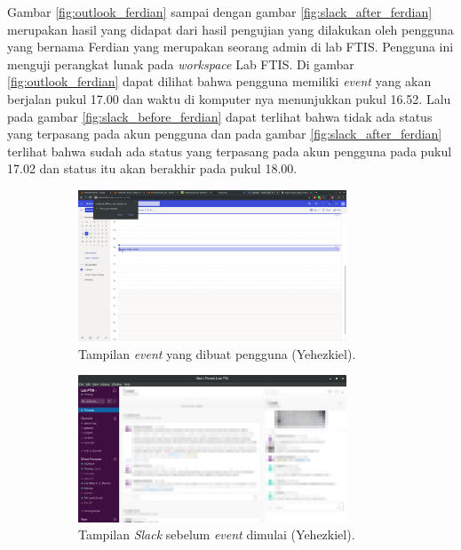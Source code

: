 Gambar \ref{fig:outlook_ferdian} sampai dengan gambar \ref{fig:slack_after_ferdian} merupakan hasil yang didapat dari hasil pengujian yang dilakukan oleh pengguna yang bernama Ferdian yang merupakan seorang admin di lab FTIS. Pengguna ini menguji perangkat lunak pada \textit{workspace} Lab FTIS. Di gambar \ref{fig:outlook_ferdian} dapat dilihat bahwa pengguna memiliki \textit{event} yang akan berjalan pukul 17.00 dan waktu di komputer nya menunjukkan pukul 16.52. Lalu pada gambar \ref{fig:slack_before_ferdian} dapat terlihat bahwa tidak ada status yang terpasang pada akun pengguna dan pada gambar \ref{fig:slack_after_ferdian} terlihat bahwa sudah ada status yang terpasang pada akun pengguna pada pukul 17.02 dan status itu akan berakhir pada pukul 18.00. 

\begin{figure}[h]
\begin{subfigure}{8.5cm}
  \centering
  \includegraphics[width=8cm]{./Gambar/PengujianKikil/Outlook.png}
  \caption{Tampilan \textit{event} yang dibuat pengguna (Yehezkiel).}
  \label{fig:outlook_kikil}
\end{subfigure}
\begin{subfigure}{8.5cm}
  \centering
  \includegraphics[width=8cm]{./Gambar/PengujianKikil/Slack_Before.png}
  \caption{Tampilan \textit{Slack} sebelum \textit{event} dimulai (Yehezkiel).}
  \label{fig:slack_before_kikil}
\end{subfigure}
\caption{}
\end{figure}


